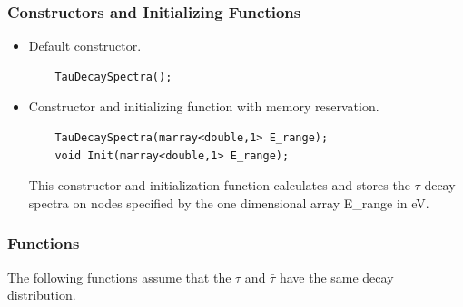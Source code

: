 \documentclass[3p,12pt]{elsarticle}
\newcommand{\ttf}{\ttfamily}
\begin{document}
\subsubsection{Constructors and Initializing Functions}

\begin{itemize}
\item Default constructor.
  \begin{lstlisting}
    TauDecaySpectra();
  \end{lstlisting}
\item Constructor and initializing function with memory reservation.
  \begin{lstlisting}
    TauDecaySpectra(marray<double,1> E_range);
    void Init(marray<double,1> E_range);
  \end{lstlisting}
This constructor and initialization function calculates and stores the
$\tau$ decay spectra on nodes specified by the one dimensional array
{\ttf E\_range} in eV.
\end{itemize}

\subsubsection{Functions}

The following functions assume that the $\tau$ and $\bar{\tau}$ have
the same decay distribution. 
\end{document}
